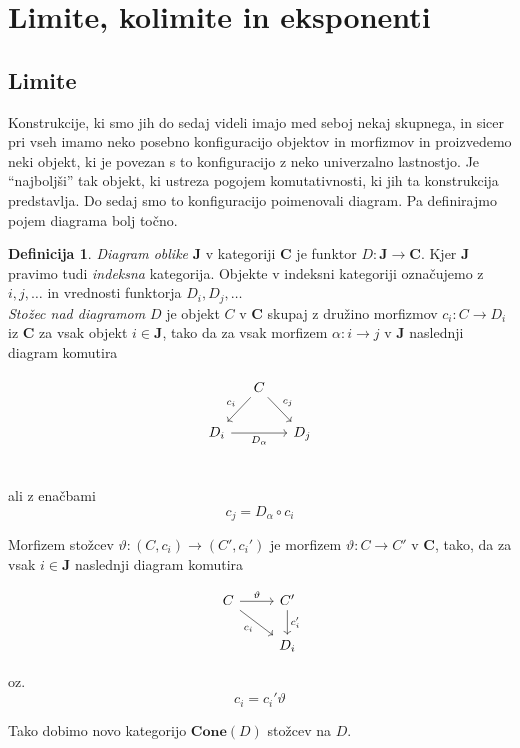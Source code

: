 \documentclass[12pt,a4paper]{book}
\theoremstyle{definition}
\newtheorem{definicija}{Definicija}[chapter]
\theoremstyle{plain}
\theoremstyle{definition}
\theoremstyle{remark}
\newcommand{\cat}[1]{\textbf{#1}}
\begin{document}
\section{Limite, kolimite in eksponenti}


\subsection{Limite}

Konstrukcije, ki smo jih do sedaj videli imajo med seboj nekaj skupnega, in sicer pri vseh imamo neko posebno konfiguracijo objektov in morfizmov in proizvedemo neki objekt, ki je povezan s to konfiguracijo z neko univerzalno lastnostjo. Je "`najboljši"' tak objekt, ki ustreza pogojem komutativnosti, ki jih ta konstrukcija predstavlja. Do sedaj smo to konfiguracijo poimenovali diagram. Pa definirajmo pojem diagrama bolj točno.

\begin{definicija}
\textit{Diagram oblike} $\cat{J}$ v kategoriji $\cat{C}$ je funktor $D : \cat{J} \to \cat{C}$. Kjer $\cat{J}$ pravimo tudi \textit{indeksna} kategorija. Objekte v indeksni kategoriji označujemo z $i,j,\ldots$ in vrednosti funktorja $D_i,D_j,\ldots$ \\
\textit{Stožec nad diagramom} $D$ je objekt $C$ v $\cat{C}$ skupaj z družino morfizmov $c_i : C \to D_i$ iz $\cat{C}$ za vsak objekt $i \in \cat{J}$, tako da za vsak morfizem $\alpha : i \to j$ v $\cat{J}$ naslednji diagram komutira

$$\begin{tikzcd}[column sep=small]
& C \ar[dl, "c_i"'] \ar[dr, "c_j"] & \\
D_i \ar[rr, "D_\alpha"'] & & D_j \\
\end{tikzcd}$$

ali z enačbami $$c_j = D_\alpha \circ c_i$$

Morfizem stožcev $\vartheta : (C, c_i) \to (C', c_i')$ je morfizem $\vartheta : C \to C'$ v $\cat{C}$, tako, da za vsak $i \in \cat{J}$ naslednji diagram komutira

$$\begin{tikzcd}
C \ar[dr, "c_i"'] \ar[r, "\vartheta"] & C' \ar[d, "c_i'"] \\
& D_i
\end{tikzcd}$$

oz. $$c_i = c_i' \vartheta$$

Tako dobimo novo kategorijo $\cat{Cone}(D)$ stožcev na $D$.
\end{definicija}
\end{document}
